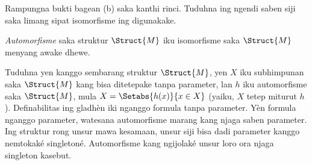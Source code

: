 \documentclass[../../../include/open-logic-section]{subfiles}
\begin{document}
\begin{prob}
Rampungna bukti bagean (b)
saka 
kanthi rinci. Tuduhna
ing ngendi saben siji
saka limang sipat
isomorfisme ing
digunakake.
\end{prob}

\begin{defn}
\emph{Automorfisme} saka
struktur $\Struct{M}$
iku isomorfisme saka
$\Struct{M}$ menyang
awake dhewe.
\end{defn}

\begin{prob}
Tuduhna yen kanggo
sembarang struktur
$\Struct{M}$, yen $X$
iku subhimpunan saka
$\Struct{M}$ kang
bisa ditetepake tanpa parameter,
lan $h$ iku automorfisme
saka $\Struct{M}$,
mula $X
= \Setabs{h(x)}{x \in X}$
(yaiku, $X$ tetep
miturut $h$). Definabilitas ing gladhèn iki nganggo formula tanpa parameter. Yèn formula nganggo parameter, watesana automorfisme marang kang njaga saben parameter. Ing struktur rong unsur mawa kesamaan, unsur siji bisa dadi parameter kanggo nemtokaké singletoné. Automorfisme kang ngijolaké unsur loro ora njaga singleton kasebut.
\end{prob}
\end{document}
